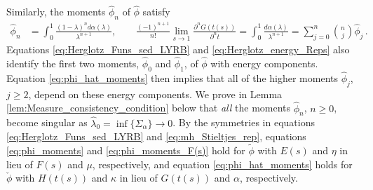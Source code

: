 \documentclass[english,12pt,jmp,graphicx]{revtex4-1}
\newcommand{\ph}{\hat{\phi}}
\begin{document}
Similarly, the moments $\ph_n$ of $\ph$
satisfy  
%
\begin{align}\label{eq:phi_hat_moments}
  \ph_n%
      &=\int_0^1\frac{(1-\lambda)^nd\alpha(\lambda)}{\lambda^{n+1}}, \qquad
      \frac{(-1)^{n+1}}{n!}\lim_{s\to1}\frac{\partial^nG(t(s))}{\partial^nt}
         =\int_0^1\frac{d\alpha(\lambda)}{\lambda^{n+1}}
          =\sum_{j=0}^n{n \choose j} \ph_j\,.
\end{align}
%
Equations
\eqref{eq:Herglotz_Funs_sed_LYRB} and \eqref{eq:Herglotz_energy_Reps}
also identify the first two moments, $\ph_0$ and $\ph_1$, of
$\ph$ with energy components. Equation \eqref{eq:phi_hat_moments} then
implies that all of the higher moments $\ph_j$, $j\geq2$, depend on these
energy components. We prove in Lemma
\ref{lem:Measure_consistency_condition} below that \emph{all} the
moments $\ph_n$, $n\geq0$, become singular as
$\hat{\lambda}_0=\inf\{\Sigma_\alpha\}\to0$. By the symmetries in equations 
\eqref{eq:Herglotz_Funs_sed_LYRB} and \eqref{eq:mh_Stieltjes_rep},
equations \eqref{eq:phi_moments} and \eqref{eq:phi_moments_F(s)} hold for
$\tilde{\phi}$ with $E(s)$ and $\eta$ in lieu of $F(s)$ and $\mu$,
respectively, and equation \eqref{eq:phi_hat_moments} holds for
$\check{\phi}$ with $H(t(s))$ and $\kappa$ in lieu of $G(t(s))$ and $\alpha$,
respectively.
\end{document}
